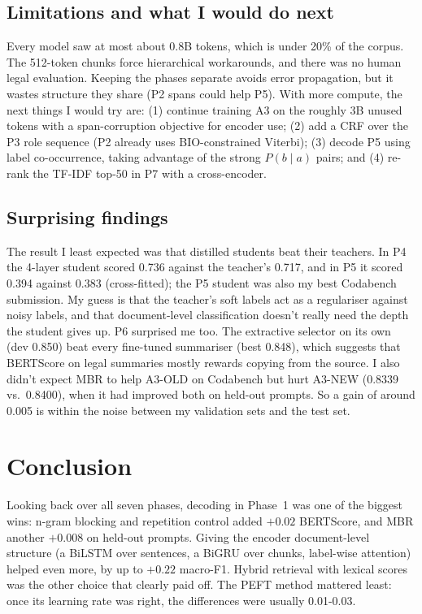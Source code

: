 \documentclass[11pt, oneside]{article}
\begin{document}
\subsection{Limitations and what I would do next}
Every model saw at most about 0.8B tokens, which is under 20\% of the corpus.
The 512-token chunks force hierarchical workarounds, and there was no human
legal evaluation. Keeping the phases separate avoids error propagation, but it
wastes structure they share (P2 spans could help P5). With more compute, the
next things I would try are: (1) continue training A3 on the roughly 3B unused
tokens with a span-corruption objective for encoder use; (2) add a CRF over
the P3 role sequence (P2 already uses BIO-constrained Viterbi); (3) decode P5
using label co-occurrence, taking advantage of the strong $P(b \mid a)$ pairs;
and (4) re-rank the TF-IDF top-50 in P7 with a cross-encoder.

\subsection{Surprising findings}
The result I least expected was that distilled students beat their teachers.
In P4 the 4-layer student scored 0.736 against the teacher's 0.717, and in P5
it scored 0.394 against 0.383 (cross-fitted); the P5 student was also my best
Codabench submission. My guess is that the teacher's soft labels act as a
regulariser against noisy labels, and that document-level classification
doesn't really need the depth the student gives up.
P6 surprised me too. The extractive selector on its own (dev 0.850) beat every
fine-tuned summariser (best 0.848), which suggests that BERTScore on legal
summaries mostly rewards copying from the source.
I also didn't expect MBR to help A3-OLD on Codabench but hurt A3-NEW (0.8339
vs.\ 0.8400), when it had improved both on held-out prompts. So a gain of
around 0.005 is within the noise between my validation sets and the test set.

\section{Conclusion}
Looking back over all seven phases, decoding in Phase~1 was one of the biggest
wins: n-gram blocking and repetition control added $+0.02$ BERTScore, and MBR
another $+0.008$ on held-out prompts. Giving the encoder document-level
structure (a BiLSTM over sentences, a BiGRU over chunks, label-wise attention)
helped even more, by up to $+0.22$ macro-F1. Hybrid retrieval with lexical
scores was the other choice that clearly paid off. The PEFT method mattered
least: once its learning rate was right, the differences were usually
0.01-0.03.
\end{document}
